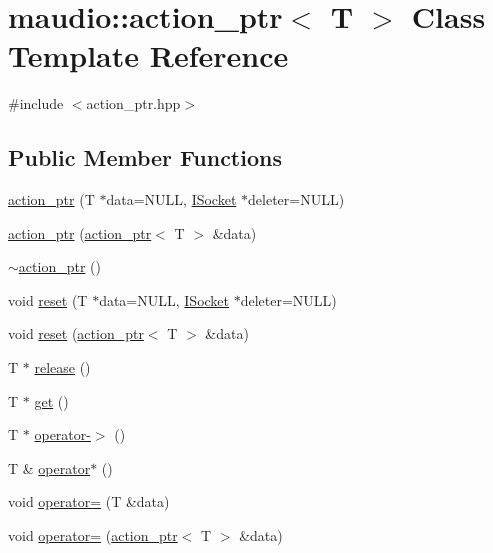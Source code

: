 \hypertarget{classmaudio_1_1action__ptr}{\section{maudio\-:\-:action\-\_\-ptr$<$ T $>$ Class Template Reference}
\label{classmaudio_1_1action__ptr}
}


{\ttfamily \#include $<$action\-\_\-ptr.\-hpp$>$}

\subsection*{Public Member Functions}
\begin{DoxyCompactItemize}
\item 
\hyperlink{classmaudio_1_1action__ptr_a414e095e0ed17c0dbd2e6a01bf41871d}{action\-\_\-ptr} (T $\ast$data=N\-U\-L\-L, \hyperlink{classmaudio_1_1ISocket}{I\-Socket} $\ast$deleter=N\-U\-L\-L)
\item 
\hyperlink{classmaudio_1_1action__ptr_a592119f0639e725d792f80efb59a8d9e}{action\-\_\-ptr} (\hyperlink{classmaudio_1_1action__ptr}{action\-\_\-ptr}$<$ T $>$ \&data)
\item 
\hyperlink{classmaudio_1_1action__ptr_a99095fe491a5591227e9b2dd1dbd9853}{$\sim$action\-\_\-ptr} ()
\item 
void \hyperlink{classmaudio_1_1action__ptr_a5b4213219b56589176b545cb2e9436cd}{reset} (T $\ast$data=N\-U\-L\-L, \hyperlink{classmaudio_1_1ISocket}{I\-Socket} $\ast$deleter=N\-U\-L\-L)
\item 
void \hyperlink{classmaudio_1_1action__ptr_acc40c7d3547f0d26f94e8407c9a1685a}{reset} (\hyperlink{classmaudio_1_1action__ptr}{action\-\_\-ptr}$<$ T $>$ \&data)
\item 
T $\ast$ \hyperlink{classmaudio_1_1action__ptr_a420e3d1263ca387a9d60978a0baca963}{release} ()
\item 
T $\ast$ \hyperlink{classmaudio_1_1action__ptr_ac0422ef083b546e0cd5986e7af6ff952}{get} ()
\item 
T $\ast$ \hyperlink{classmaudio_1_1action__ptr_a0e0eed18b2a7b92c500d9635f7b51954}{operator-\/$>$} ()
\item 
T \& \hyperlink{classmaudio_1_1action__ptr_adfb525b54d0ae061b525193f7d57836d}{operator$\ast$} ()
\item 
void \hyperlink{classmaudio_1_1action__ptr_aaed11cbe3e07dedd7a8d69eedc6919b0}{operator=} (T \&data)
\item 
void \hyperlink{classmaudio_1_1action__ptr_a157e3c595bfc376454f1391b0c890476}{operator=} (\hyperlink{classmaudio_1_1action__ptr}{action\-\_\-ptr}$<$ T $>$ \&data)

\end{DoxyCompactItemize}
